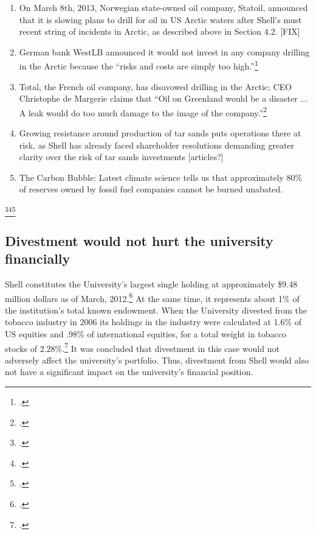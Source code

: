 \begin{enumerate}
	\item On March 8th, 2013, Norwegian state-owned oil company, Statoil, announced that it is slowing plans to drill for oil in US Arctic waters after Shell’s must recent string of incidents in Arctic, as described above in Section 4.2. [FIX]
	\item German bank WestLB announced it would not invest in any company drilling in the Arctic because the ``risks and costs are simply too high.''\footcite[][]{Naidoo_2012}
	\item Total, the French oil company, has disavowed drilling in the Arctic; CEO Christophe de Margerie claims that ``Oil on Greenland would be a disaster ... A leak would do too much damage to the image of the company.''\footcite[][]{NewsWire_2012}
	\item Growing resistance around production of tar sands puts operations there at risk, as Shell has already faced shareholder resolutions demanding greater clarity over the risk of tar sands investments [articles?]
	\item The Carbon Bubble: Latest climate science tells us that approximately 80\% of reserves owned by fossil fuel companies cannot be burned unabated.
\end{enumerate}\footcite[][]{carbontracker}\footcite[][]{UNEP_2009}\footcite[][]{HSBC_2013}


	\subsection{Divestment would not hurt the university financially}
	


Shell constitutes the University’s largest single holding at approximately \$9.48 million dollars as of March, 2012.\footcite[][]{UTAM_2012}  
At the same time, it represents about 1\% of the institution’s total known endowment. 
When the University divested from the tobacco industry in 2006 its holdings in the industry were calculated at 1.6\% of US equities and .98\% of international equities, for a total weight in tobacco stocks of 2.28\%.\footcite[][]{TobaccoReport_2007}
It was concluded that divestment in this case would not adversely affect the university’s portfolio. 
Thus, divestment from Shell would also not have a significant impact on the university’s financial position. 






